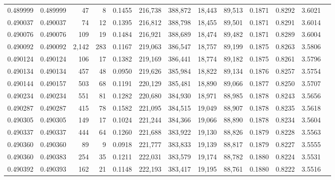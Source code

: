 \begin{tabular}{rrrrrrrrrrrrr}
0.489999 & 0.489999 &    47 &     8 &                                     0.1455 & 216,738 & 388,872 &  18,443 &  89,513 & 0.1871 & 0.8292 & 3.6021 \\
0.490037 & 0.490037 &    74 &    12 &                                     0.1395 & 216,812 & 388,798 &  18,455 &  89,501 & 0.1871 & 0.8291 & 3.6014 \\
0.490076 & 0.490076 &   109 &    19 &                                     0.1484 & 216,921 & 388,689 &  18,474 &  89,482 & 0.1871 & 0.8289 & 3.6004 \\
0.490092 & 0.490092 & 2,142 &   283 &                                     0.1167 & 219,063 & 386,547 &  18,757 &  89,199 & 0.1875 & 0.8263 & 3.5806 \\
0.490124 & 0.490124 &   106 &    17 &                                     0.1382 & 219,169 & 386,441 &  18,774 &  89,182 & 0.1875 & 0.8261 & 3.5796 \\
0.490134 & 0.490134 &   457 &    48 &                                     0.0950 & 219,626 & 385,984 &  18,822 &  89,134 & 0.1876 & 0.8257 & 3.5754 \\
0.490144 & 0.490157 &   503 &    68 &                                     0.1191 & 220,129 & 385,481 &  18,890 &  89,066 & 0.1877 & 0.8250 & 3.5707 \\
0.490234 & 0.490234 &   551 &    81 &                                     0.1282 & 220,680 & 384,930 &  18,971 &  88,985 & 0.1878 & 0.8243 & 3.5656 \\
0.490287 & 0.490287 &   415 &    78 &                                     0.1582 & 221,095 & 384,515 &  19,049 &  88,907 & 0.1878 & 0.8235 & 3.5618 \\
0.490305 & 0.490305 &   149 &    17 &                                     0.1024 & 221,244 & 384,366 &  19,066 &  88,890 & 0.1878 & 0.8234 & 3.5604 \\
0.490337 & 0.490337 &   444 &    64 &                                     0.1260 & 221,688 & 383,922 &  19,130 &  88,826 & 0.1879 & 0.8228 & 3.5563 \\
0.490360 & 0.490360 &    89 &     9 &                                     0.0918 & 221,777 & 383,833 &  19,139 &  88,817 & 0.1879 & 0.8227 & 3.5555 \\
0.490360 & 0.490383 &   254 &    35 &                                     0.1211 & 222,031 & 383,579 &  19,174 &  88,782 & 0.1880 & 0.8224 & 3.5531 \\
0.490392 & 0.490393 &   162 &    21 &                                     0.1148 & 222,193 & 383,417 &  19,195 &  88,761 & 0.1880 & 0.8222 & 3.5516 \\

\end{tabular}
